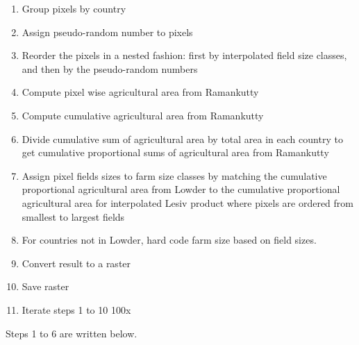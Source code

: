 \documentclass{article}\usepackage[]{graphicx}\usepackage[]{xcolor}
\begin{document}
\begin{enumerate}
  \item Group pixels by country
  \item Assign pseudo-random number to pixels
  \item Reorder the pixels in a nested fashion: first by interpolated field size classes, and then by the pseudo-random numbers
  \item Compute pixel wise agricultural area from Ramankutty 
  \item Compute cumulative agricultural area from Ramankutty 
  \item Divide cumulative sum of agricultural area by total area in each country to get cumulative proportional sums of agricultural area from Ramankutty 
  \item Assign pixel fields sizes to farm size classes by matching the cumulative proportional agricultural area from Lowder to the cumulative proportional agricultural area for interpolated Lesiv product  where pixels are ordered from smallest to largest fields
  \item For countries not in Lowder, hard code farm size based on field sizes.
  \item Convert result to a raster
  \item Save raster
  \item Iterate steps 1 to 10 100x
\end{enumerate}


Steps 1 to 6 are written below.
\end{document}
